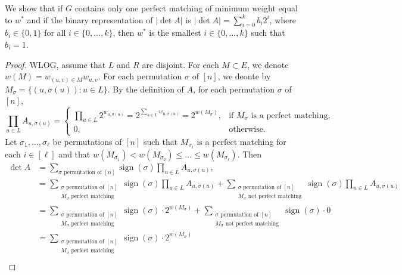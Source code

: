 \documentclass[letterpaper, reqno,11pt]{article}
\DeclareMathOperator{\sign}{sign}
\begin{document}
\begin{enumerate}
\begin{enumerate}
    \bigskip

    We show that if $G$ contains only one perfect matching of minimum weight equal to $w^*$ and if the binary representation of $|\det A|$ is $|\det A| = \sum_{i = 0}^k b_i 2^i$, where $b_i \in \{ 0, 1 \}$ for all $i \in \{ 0, \ldots, k \}$, then $w^*$ is the smallest $i \in \{ 0, \ldots, k \}$ such that $b_i = 1$.

    \begin{proof}
      WLOG, assume that $L$ and $R$ are disjoint. For each $M \subset E$, we denote $w(M) = w_{(u, v) \in M} w_{u, v}$. For each permutation $\sigma$ of $[n]$, we deonte by $M_\sigma = \{ (u, \sigma(u)) : u \in L \}$. By the definition of $A$, for each permutation $\sigma$ of $[n]$,
      $$ \prod_{u \in L} A_{u, \sigma(u)} = \left\{
        \begin{array}{ll}
          \prod_{u \in L} 2^{w_{u, \sigma(u)}} = 2^{\sum_{u \in L} w_{u, \sigma(u)}} = 2^{w\left(M_\sigma\right)}, & \text{if $M_\sigma$ is a perfect matching}, \\
          0, & \text{otherwise}.
        \end{array}
      \right. $$
      Let $\sigma_1, \ldots, \sigma_\ell$ be permutations of $[n]$ such that $M_{\sigma_i}$ is a perfect matching for each $i \in [\ell]$ and that $w(M_{\sigma_1}) < w(M_{\sigma_2}) \leq \ldots \leq w(M_{\sigma_\ell})$. Then
      \begin{align*}
        \det A &= \sum_{\text{$\sigma$ permutation of $[n]$}} \sign(\sigma) \prod_{u \in L} A_{u, \sigma(u)}, \\
        &= \sum_{\substack{\text{$\sigma$ permutation of $[n]$} \\ \text{$M_\sigma$ perfect matching}}} \sign(\sigma) \prod_{u \in L} A_{u, \sigma(u)} + \sum_{\substack{\text{$\sigma$ permutation of $[n]$} \\ \text{$M_\sigma$ not perfect matching}}} \sign(\sigma) \prod_{u \in L} A_{u, \sigma(u)} \\
        &= \sum_{\substack{\text{$\sigma$ permutation of $[n]$} \\ \text{$M_\sigma$ perfect matching}}} \sign(\sigma) \cdot 2^{w\left(M_\sigma\right)} + \sum_{\substack{\text{$\sigma$ permutation of $[n]$} \\ \text{$M_\sigma$ not perfect matching}}} \sign(\sigma) \cdot 0 \\
        &= \sum_{\substack{\text{$\sigma$ permutation of $[n]$} \\ \text{$M_\sigma$ perfect matching}}} \sign(\sigma) \cdot 2^{w\left(M_\sigma\right)} \\

\end{align*}
\end{proof}
\end{enumerate}
\end{enumerate}
\end{document}
